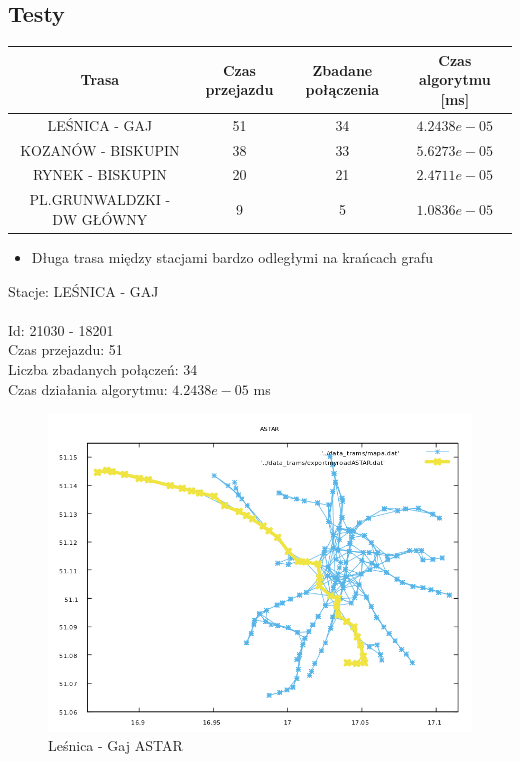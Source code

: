 \documentclass[13pt]{article}
\begin{document}
\newpage
\subsection{Testy}

\begin{tabular}{|c|c|c|c|} \hline
Trasa & Czas przejazdu  & Zbadane połączenia & Czas algorytmu [ms]\\
\hline \hline
 LEŚNICA - GAJ & 51 & 34 &  $4.2438e-05$ \\
 \hline
 KOZANÓW - BISKUPIN & 38 & 33 &  $5.6273e-05$ \\
 \hline
 RYNEK - BISKUPIN & 20 & 21 & $2.4711e-05$ \\
 \hline
 PL.GRUNWALDZKI - DW GŁÓWNY & 9 & 5 &  $1.0836e-05$\\
 \hline
\end{tabular}

\begin{itemize}
\item Długa trasa między stacjami bardzo odległymi na krańcach grafu
\end{itemize}
\hspace{1.5cm} Stacje: LEŚNICA - GAJ \\\\
Id: 21030   - 18201\\
Czas przejazdu: 51\\
Liczba zbadanych połączeń: 34\\
Czas działania algorytmu: $4.2438e-05$ ms\\
\begin{figure}[hp]
\centering
\includegraphics[width=1\textwidth]{wykresy/LES_GAJ_ASTAR.png}
\caption{Leśnica - Gaj ASTAR}
\end{figure}
\end{document}
